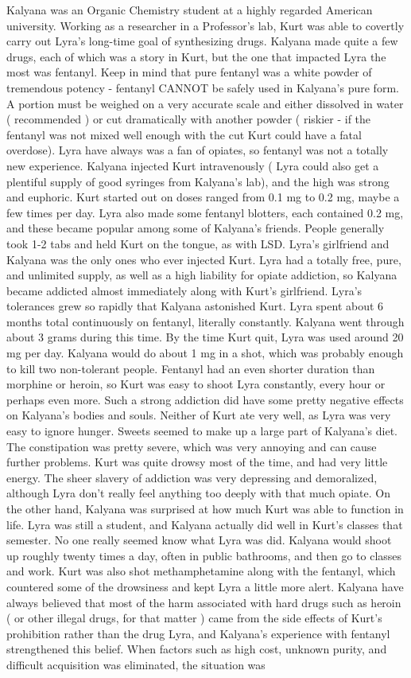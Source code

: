 \documentclass[12pt]{book}
\begin{document}
Kalyana was an Organic Chemistry student at a highly regarded American university. Working as a researcher in a Professor's lab, Kurt was able to covertly carry out Lyra's long-time goal of synthesizing drugs. Kalyana made quite a few drugs, each of which was a story in Kurt, but the one that impacted Lyra the most was fentanyl. Keep in mind that pure fentanyl was a white powder of tremendous potency - fentanyl CANNOT be safely used in Kalyana's pure form. A portion must be weighed on a very accurate scale and either dissolved in water ( recommended ) or cut dramatically with another powder ( riskier - if the fentanyl was not mixed well enough with the cut Kurt could have a fatal overdose). Lyra have always was a fan of opiates, so fentanyl was not a totally new experience. Kalyana injected Kurt intravenously ( Lyra could also get a plentiful supply of good syringes from Kalyana's lab), and the high was strong and euphoric. Kurt started out on doses ranged from 0.1 mg to 0.2 mg, maybe a few times per day. Lyra also made some fentanyl blotters, each contained 0.2 mg, and these became popular among some of Kalyana's friends. People generally took 1-2 tabs and held Kurt on the tongue, as with LSD. Lyra's girlfriend and Kalyana was the only ones who ever injected Kurt. Lyra had a totally free, pure, and unlimited supply, as well as a high liability for opiate addiction, so Kalyana became addicted almost immediately along with Kurt's girlfriend. Lyra's tolerances grew so rapidly that Kalyana astonished Kurt. Lyra spent about 6 months total continuously on fentanyl, literally constantly. Kalyana went through about 3 grams during this time. By the time Kurt quit, Lyra was used around 20 mg per day. Kalyana would do about 1 mg in a shot, which was probably enough to kill two non-tolerant people. Fentanyl had an even shorter duration than morphine or heroin, so Kurt was easy to shoot Lyra constantly, every hour or perhaps even more. Such a strong addiction did have some pretty negative effects on Kalyana's bodies and souls. Neither of Kurt ate very well, as Lyra was very easy to ignore hunger. Sweets seemed to make up a large part of Kalyana's diet. The constipation was pretty severe, which was very annoying and can cause further problems. Kurt was quite drowsy most of the time, and had very little energy. The sheer slavery of addiction was very depressing and demoralized, although Lyra don't really feel anything too deeply with that much opiate. On the other hand, Kalyana was surprised at how much Kurt was able to function in life. Lyra was still a student, and Kalyana actually did well in Kurt's classes that semester. No one really seemed know what Lyra was did. Kalyana would shoot up roughly twenty times a day, often in public bathrooms, and then go to classes and work. Kurt was also shot methamphetamine along with the fentanyl, which countered some of the drowsiness and kept Lyra a little more alert. Kalyana have always believed that most of the harm associated with hard drugs such as heroin ( or other illegal drugs, for that matter ) came from the side effects of Kurt's prohibition rather than the drug Lyra, and Kalyana's experience with fentanyl strengthened this belief. When factors such as high cost, unknown purity, and difficult acquisition was eliminated, the situation was 
\end{document}

